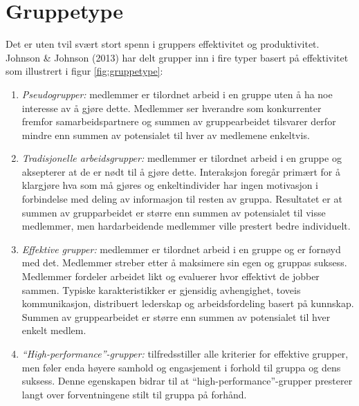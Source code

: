 \section{Gruppetype}
\label{sec:gruppetype}
Det er uten tvil svært stort spenn i gruppers effektivitet og produktivitet. Johnson \& Johnson (2013) \citep{gruppeteori} har delt grupper inn i fire typer basert på effektivitet som illustrert i figur \ref{fig:gruppetype}:
\begin{enumerate}
\item \textit{Pseudogrupper:} medlemmer er tilordnet arbeid i en gruppe uten å ha noe interesse av å gjøre dette. Medlemmer ser hverandre som konkurrenter fremfor samarbeidspartnere og summen av gruppearbeidet tilsvarer derfor mindre enn summen av potensialet til hver av medlemene enkeltvis. \citep{gruppeteori}
\item \textit{Tradisjonelle arbeidsgrupper:} medlemmer er tilordnet arbeid i en gruppe og aksepterer at de er nødt til å gjøre dette. Interaksjon foregår primært for å klargjøre hva som må gjøres og enkeltindivider har ingen motivasjon i forbindelse med deling av informasjon til resten av gruppa. Resultatet er at summen av grupparbeidet er større enn summen av potensialet til visse medlemmer, men hardarbeidende medlemmer ville prestert bedre individuelt. \citep{gruppeteori}

\item \textit{Effektive grupper:} medlemmer er tilordnet arbeid i en gruppe og er fornøyd med det. Medlemmer streber etter å maksimere sin egen og gruppas suksess. Medlemmer fordeler arbeidet likt og evaluerer hvor effektivt de jobber sammen. Typiske karakteristikker er gjensidig avhengighet, toveis kommunikasjon, distribuert lederskap og arbeidsfordeling basert på kunnskap. Summen av gruppearbeidet er større enn summen av potensialet til hver enkelt medlem. \citep{gruppeteori}

\item \textit{``High-performance''-grupper:} tilfredsstiller alle kriterier for effektive grupper, men føler enda høyere samhold og engasjement i forhold til gruppa og dens suksess. Denne egenskapen bidrar til at ``high-performance''-grupper presterer langt over forventningene stilt til gruppa på forhånd. \citep{gruppeteori}


\end{enumerate}
